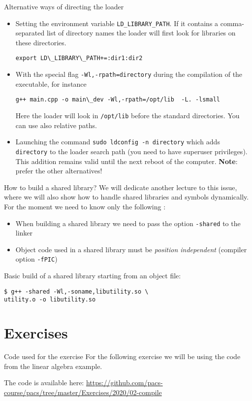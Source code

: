 \documentclass[10pt]{beamer}
\begin{document}
\begin{frame}[fragile]{Alternative ways of directing the loader}
\begin{itemize}
\item Setting the environment variable \texttt{LD\_LIBRARY\_PATH}. If
it contains a comma-separated list of directory names the
loader will first look for libraries on these directories.
\begin{verbatim}
export LD\_LIBRARY\_PATH+=:dir1:dir2
\end{verbatim}
\item With the special flag \texttt{-Wl,-rpath=directory}
during the compilation of the executable, for instance
\begin{verbatim}
g++ main.cpp -o main\_dev -Wl,-rpath=/opt/lib  -L. -lsmall
\end{verbatim}
Here the loader will look in \texttt{/opt/lib} before the standard directories. You can use also relative paths.
\item Launching the command \texttt{sudo ldconfig -n directory} which adds \texttt{directory} to the loader search path (you need to have superuser privileges). This addition remains valid until the next reboot of the computer. \textbf{Note}: prefer the other alternatives!

\end{itemize}
\end{frame}

\begin{frame}[fragile]{How to build a shared library?}
We will dedicate another lecture to this issue, where we will also show how to handle shared libraries and symbols dynamically.
For the moment we need to know only the following :
\begin{itemize}
\item When building a shared library we need to pass the option \texttt{-shared} to the linker
\item Object code used in a shared library must be \emph{position independent} (compiler option \texttt{-fPIC})
\end{itemize}

Basic build of a shared library starting from an object file:
\begin{verbatim}
$ g++ -shared -Wl,-soname,libutility.so \
utility.o -o libutility.so
\end{verbatim}
\end{frame}


\section{Exercises}
\begin{frame}{Code used for the exercise}
For the following exercise we will be using the code from the linear algebra example.

The code is available here: \url{https://github.com/pacs-course/pacs/tree/master/Exercises/2020/02-compile}
\end{frame}
\end{document}
